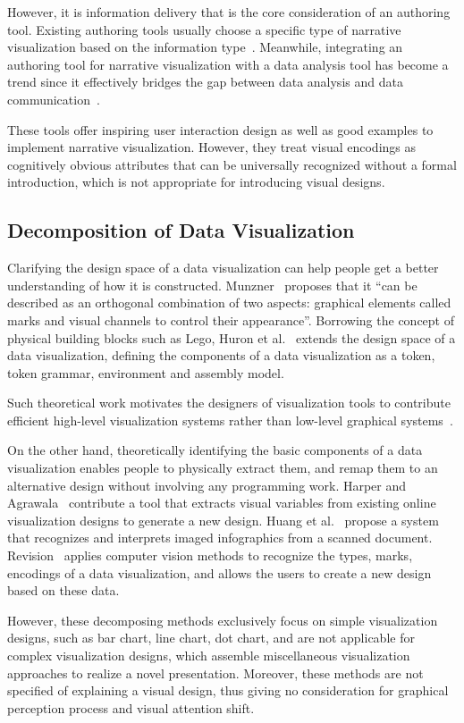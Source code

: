 However, it is information delivery that is the core consideration of an authoring tool. Existing authoring tools usually choose a specific type of narrative visualization based on the information type~\cite{amini_authoring_2017, fulda_timelinecurator:_2016}. Meanwhile, integrating an authoring tool for narrative visualization with a  data analysis tool has become a trend since it effectively bridges the gap between data analysis and data communication~\cite{eccles_stories_2007, bryan_temporal_2016,lee_more_2015}. 
 
These tools offer inspiring user interaction design as well as good examples to implement narrative visualization. However, they treat visual encodings as cognitively obvious attributes that can be universally recognized without a formal introduction, which is not appropriate for introducing visual designs.

\subsection{Decomposition of Data Visualization}
Clarifying the design space of a data visualization can help people get a better understanding of how it is constructed. Munzner~\cite{munzner_visualization_2014} proposes that it ``can be described as an orthogonal combination of two aspects: graphical elements called marks and visual channels to control their appearance''. Borrowing the concept of physical building blocks such as Lego, Huron et al.~\cite{huron_constructive_2014} extends the design space of a data visualization, defining the components of a data visualization as a token, token grammar, environment and assembly model.

Such theoretical work motivates the designers of visualization tools to contribute efficient high-level visualization systems rather than low-level graphical systems~\cite{bostock_protovis:_2009,mendez_ivolver:_2016}. 

On the other hand, theoretically identifying the basic components of a data visualization enables people to physically extract them, and remap them to an alternative design without involving any programming work. Harper and Agrawala~\cite{harper_deconstructing_2014} contribute a tool that extracts visual variables from existing online visualization designs to generate a new design. Huang et al.~\cite{Huang:2007:SUI:1284420.1284427} propose a system that recognizes and interprets imaged
infographics from a scanned document. Revision~\cite{savva_revision:_2011} applies computer vision methods to recognize the types, marks, encodings of a data visualization, and allows the users to create a new design based on these data. 

However, these decomposing methods exclusively focus on simple visualization designs, such as bar chart, line chart, dot chart, and are not applicable for complex visualization designs, which assemble miscellaneous visualization approaches to realize a novel presentation. Moreover, these methods are not specified of explaining a visual design, thus giving no consideration for graphical perception process and visual attention shift. 
